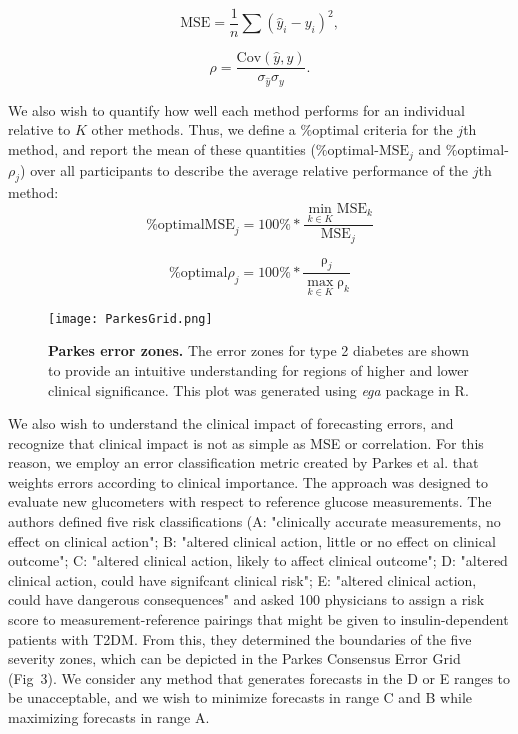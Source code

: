 \documentclass[10pt,letterpaper]{article}
\begin{document}
\begin{equation}
\label{eq:MSE}
\mathrm{MSE} = \frac{1}{n}\sum{(\hat{y}_i - y_i)^2},
\end{equation}

\begin{equation}
\label{eq:correlation}
\rho = \frac{\mathrm{Cov}(\hat{y},y)}{\sigma_{\hat{y}} \sigma_{y}}.
\end{equation}

We also wish to quantify how well each method performs for an individual relative to $K$ other methods. Thus, we define a $\%$optimal criteria for the $j$th method, and report the mean of these quantities ($\%$optimal-$\mathrm{MSE}_j$ and $\%$optimal-$\rho_j$) over all participants to describe the average relative performance of the $j$th method: \\
\begin{equation}
\label{eq:fracMSE}
\% \mathrm{optimal MSE}_j = 100\%*{\frac{\min_{k \in K} \mathrm{MSE}_{k}}{\mathrm{MSE}_{j}}}
\end{equation}

\begin{equation}
\label{eq:fracCorrelation}
\% \mathrm{optimal }\rho_j = 100\%*{\frac{\mathrm{\rho}_j}{\max_{k \in K} \mathrm{\rho}_{k}}}
\end{equation}

\begin{figure}[!h]
    \centering
    \texttt{[image: ParkesGrid.png]}
    \caption{{\bf Parkes error zones.} The error zones for type 2 diabetes are shown to provide an intuitive understanding for regions of higher and lower clinical significance. This plot was generated using \emph{ega} package in R.}
    \label{fig:parkesGrid}
\end{figure}

We also wish to understand the clinical impact of forecasting errors, and recognize that clinical impact is not as simple as MSE or correlation.
For this reason, we employ an error classification metric created by Parkes et al. that weights errors according to clinical importance. The approach was designed to evaluate new glucometers with respect to reference glucose measurements. The authors defined five risk classifications (A: "clinically accurate measurements, no effect on clinical action"; B: "altered clinical action, little or no effect on clinical outcome"; C: "altered clinical action, likely to affect clinical outcome"; D: "altered clinical action, could have signifcant clinical risk"; E: "altered clinical action, could have dangerous consequences" and asked 100 physicians to assign a risk score to measurement-reference pairings that might be given to insulin-dependent patients with T2DM. From this, they determined the boundaries of the five severity zones, which can be depicted in the Parkes Consensus Error Grid (Fig~3). We consider any method that generates forecasts in the D or E ranges to be unacceptable, and we wish to minimize forecasts in range C and B while maximizing forecasts in range A.
\end{document}
